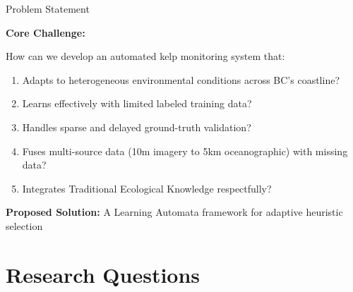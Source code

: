 \documentclass[10pt,xcolor={table,dvipsnames}]{beamer}
\begin{document}
\begin{frame}{Problem Statement}

\textbf{Core Challenge:}

How can we develop an automated kelp monitoring system that:

\begin{enumerate}
  \item Adapts to heterogeneous environmental conditions across BC's coastline?

  \item Learns effectively with limited labeled training data?

  \item Handles sparse and delayed ground-truth validation?

  \item Fuses multi-source data (10m imagery to 5km oceanographic) with missing data?

  \item Integrates Traditional Ecological Knowledge respectfully?
\end{enumerate}

\vspace{0.3em}
\textbf{Proposed Solution:} A Learning Automata framework for adaptive heuristic selection

\end{frame}

\section{Research Questions}
\end{document}
